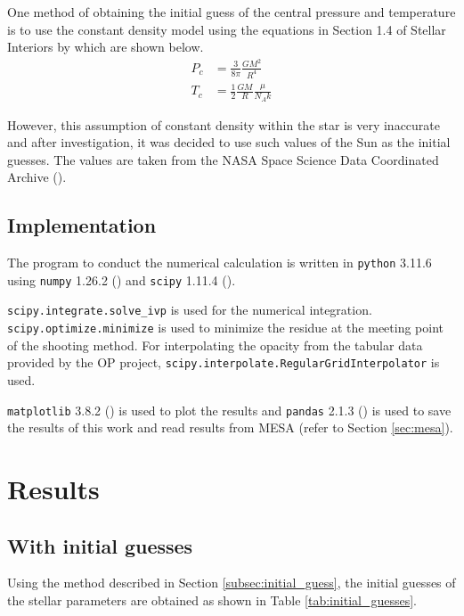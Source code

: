 \documentclass[twocolumn]{aastex631}
\begin{document}
One method of obtaining the initial guess of the central pressure and temperature is to use the constant density model using the equations in Section 1.4 of Stellar Interiors by \cite{book:StellarInteriors} which are shown below.
\begin{align}
	P_{c} & = \frac{3}{8 \pi} \frac{G M^2}{R^4}          \\
	T_{c} & = \frac{1}{2} \frac{GM}{R} \frac{\mu}{N_A k}
\end{align}

However, this assumption of constant density within the star is very inaccurate and after investigation, it was decided to use such values of the Sun as the initial guesses. The values are taken from the NASA Space Science Data Coordinated Archive (\cite{article:NASA_sun}).

\subsection{Implementation}
\label{subsec:implementation}
The program to conduct the numerical calculation is written in \verb|python| 3.11.6 \cite{article:python} using \verb|numpy| 1.26.2 (\cite{article:numpy}) and \verb|scipy| 1.11.4 (\cite{article:scipy}).

\verb|scipy.integrate.solve_ivp| is used for the numerical integration. \verb|scipy.optimize.minimize| is used to minimize the residue at the meeting point of the shooting method.
For interpolating the opacity from the tabular data provided by the OP project, \verb|scipy.interpolate.RegularGridInterpolator| is used.

\verb|matplotlib| 3.8.2 (\cite{article:matplotlib}) is used to plot the results and \verb|pandas| 2.1.3 (\cite{article:pandas}) is used to save the results of this work and read results from MESA (refer to Section \ref{sec:mesa}).


\section{Results}
\label{sec:results}

\subsection{With initial guesses}
\label{subsec:result_initial_guesses}
Using the method described in Section \ref{subsec:initial_guess}, the initial guesses of the stellar parameters are obtained as shown in Table \ref{tab:initial_guesses}.
\end{document}
